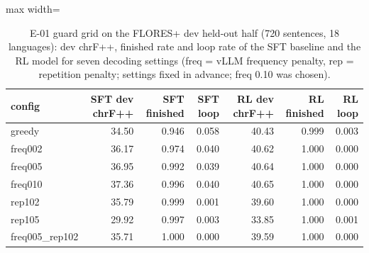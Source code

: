 \begin{table}[htbp]
\centering\footnotesize
\setlength{\tabcolsep}{4pt}
\caption{E-01 guard grid on the FLORES+ dev held-out half (720 sentences, 18 languages): dev chrF++, finished rate and loop rate of the SFT baseline and the RL model for seven decoding settings (freq = vLLM frequency penalty, rep = repetition penalty; settings fixed in advance; freq 0.10 was chosen).}\label{tab:e01-grid}
\begin{adjustbox}{max width=\linewidth}\begin{tabular}{@{}lrrrrrr@{}}
\toprule
config & SFT dev chrF++ & SFT finished & SFT loop & RL dev chrF++ & RL finished & RL loop \\
\midrule
greedy & 34.50 & 0.946 & 0.058 & 40.43 & 0.999 & 0.003 \\
freq002 & 36.17 & 0.974 & 0.040 & 40.62 & 1.000 & 0.000 \\
freq005 & 36.95 & 0.992 & 0.039 & 40.64 & 1.000 & 0.000 \\
freq010 & 37.36 & 0.996 & 0.040 & 40.65 & 1.000 & 0.000 \\
rep102 & 35.79 & 0.999 & 0.001 & 39.60 & 1.000 & 0.000 \\
rep105 & 29.92 & 0.997 & 0.003 & 33.85 & 1.000 & 0.001 \\
freq005\_rep102 & 35.71 & 1.000 & 0.000 & 39.59 & 1.000 & 0.000 \\
\bottomrule
\end{tabular}\end{adjustbox}
\end{table}